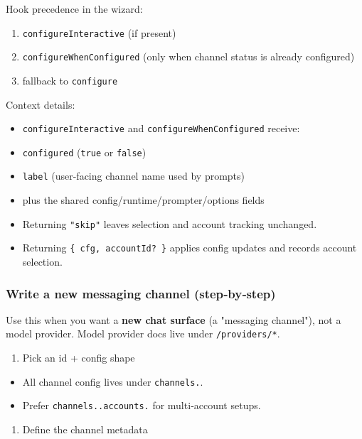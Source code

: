 Hook precedence in the wizard:

\begin{enumerate}
  \item \texttt{configureInteractive} (if present)
  \item \texttt{configureWhenConfigured} (only when channel status is already configured)
  \item fallback to \texttt{configure}
\end{enumerate}


Context details:

\begin{itemize}
  \item \texttt{configureInteractive} and \texttt{configureWhenConfigured} receive:
  \item \texttt{configured} (\texttt{true} or \texttt{false})
  \item \texttt{label} (user-facing channel name used by prompts)
  \item plus the shared config/runtime/prompter/options fields
  \item Returning \texttt{"skip"} leaves selection and account tracking unchanged.
  \item Returning \texttt{\{ cfg, accountId? \}} applies config updates and records account selection.
\end{itemize}


\subsubsection{Write a new messaging channel (step‑by‑step)}


Use this when you want a \textbf{new chat surface} (a "messaging channel"), not a model provider.
Model provider docs live under \texttt{/providers/*}.

\begin{enumerate}
  \item Pick an id + config shape
\end{enumerate}


\begin{itemize}
  \item All channel config lives under \texttt{channels.}.
  \item Prefer \texttt{channels..accounts.} for multi‑account setups.
\end{itemize}


\begin{enumerate}
  \item Define the channel metadata
\end{enumerate}


